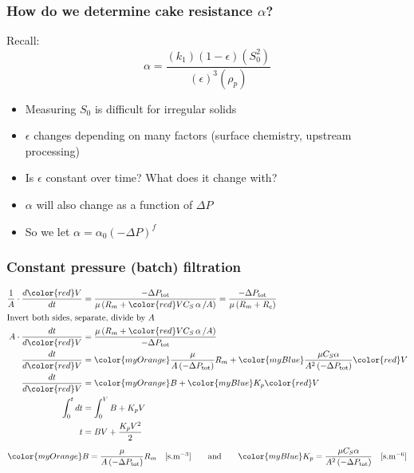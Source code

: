 \begin{frame}\frametitle{How do we determine cake resistance $\alpha$?}
	Recall:
	\[ \alpha = \dfrac{(k_1) \left(1-\epsilon\right)(S_0^2)}{(\epsilon)^3 (\rho_p)} \]
	\begin{itemize}
		\item	Measuring $S_0$ is difficult for irregular solids
		\item	$\epsilon$ changes depending on many factors (surface chemistry, upstream processing)
		\item	Is $\epsilon$ constant over time? What does it change with?
		\item	$\alpha$ will also change as a function of $\Delta P$
		\item	So we let $\alpha = \alpha_\text{0} \left(-\Delta P\right)^f$
	\end{itemize}

\end{frame}

\begin{frame}\frametitle{Constant pressure (batch) filtration}
	\begin{align*}
	   \dfrac{1}{A} \cdot \dfrac{d{\color{red}V}}{dt} &= \dfrac{-\Delta P_\text{tot}}{\mu \left(R_m + {\color{red}V} C_S \, \mathbf{ \alpha}\, / A \right)} =  \dfrac{-\Delta P_\text{tot}}{\mu \left(R_m + R_c \right)}\\
	   \intertext{Invert both sides, separate, divide by $A$}
	   A \cdot \dfrac{dt}{d{\color{red}V}} &= \dfrac{\mu \left(R_m + {\color{red}V}  C_S \, \mathbf{ \alpha}\, / A \right)}{-\Delta P_\text{tot}}\\
	   \dfrac{dt}{d{\color{red}V}} &= {\color{myOrange}\dfrac{\mu}{A\left(-\Delta P_\text{tot}\right)} R_m} + {\color{myBlue}\dfrac{\mu C_S \alpha  }{A^2 \left(-\Delta P_\text{tot}\right)}}{\color{red}V}\\
	   \dfrac{dt}{d{\color{red}V}} &= {\color{myOrange}B} + {\color{myBlue}K_p}{\color{red}V}\\
	   \int_{0}^{t}{dt} &= \int_{0}^{V}{B + K_pV}\\
	   t &= BV +  \dfrac{K_pV^2}{2}
	\end{align*}
	${\color{myOrange}B = \dfrac{\mu}{A\left(-\Delta P_\text{tot}\right)} R_m \quad [\text{s.m}^{-3}]} \qquad \text{and} \qquad {\color{myBlue}K_p = \dfrac{\mu C_S \alpha  }{A^2 \left(-\Delta P_\text{tot}\right)} \quad [\text{s.m}^{-6}]}$
\end{frame}

